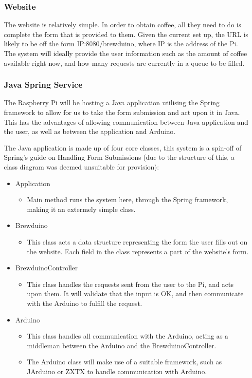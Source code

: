 \documentclass[12pt, a4paper]{article}
\begin{document}
\subsubsection{Website}
The website is relatively simple. In order to obtain coffee, all they need to
do is complete the form that is provided to them. Given the current set up, the
URL is likely to be off the form IP:8080/brewduino, where IP is the address of
the Pi. The system will ideally provide the user information such as the amount
of coffee available right now, and how many requests are currently in a queue to
be filled.

\subsubsection{Java Spring Service}
The Raspberry Pi will be hosting a Java application utilising the Spring
framework to allow for us to take the form submission and act upon it in Java.
This has the advantages of allowing communication between Java application and
the user, as well as between the application and Arduino.

The Java application is made up of four core classes, this system is a spin-off
of Spring's guide on Handling Form Submissions\cite{SpringGuide} (due to the
structure of this, a class diagram was deemed unsuitable for provision):
\begin{itemize}
	\item Application
	\begin{itemize}
		\item Main method runs the system here, through the Spring framework,
		making it an extermely simple class.
	\end{itemize}
	\item Brewduino
	\begin{itemize}
		\item This class acts a data structure representing the form the user
		fills out on the website. Each field in the class represents a part of
		the website's form.
	\end{itemize}
	\item BrewduinoController
	\begin{itemize}
		\item This class handles the requests sent from the user to the Pi, and
		acts upon them. It will validate that the input is OK, and then
		communicate with the Arduino to fulfill the request.
	\end{itemize}
	\item Arduino
	\begin{itemize}
		\item This class handles all communication with the Arduino, acting as a
		middleman between the Arduino and the BrewduinoController.
		\item The Arduino class will make use of a suitable framework, such as
		JArduino\cite{JArduino} or ZXTX\cite{RXTX} to handle communication with
		Arduino.
	\end{itemize}
\end{itemize}
\newpage
\end{document}
